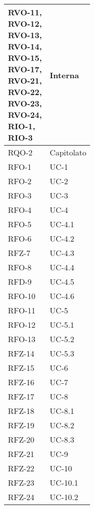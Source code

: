 \begin{xltabular}{\textwidth}{|X | X|}
{                RVO-11, \\
                RVO-12, \\
                RVO-13, \\
                RVO-14, \\
                RVO-15, \\
                RVO-17, \\
                RVO-21, \\
                RVO-22, \\
                RVO-23, \\
                RVO-24, \\
                RIO-1, \\
                RIO-3} & Interna \\
    \hline
    RQO-2 & Capitolato \\
    \hline
    RFO-1 & UC-1  \\
    \hline
    RFO-2 & UC-2  \\
    \hline
    RFO-3 & UC-3 \\
    \hline
    RFO-4 & UC-4 \\
    \hline
    RFO-5 & UC-4.1 \\
    \hline
    RFO-6 & UC-4.2 \\
    \hline
    RFZ-7 & UC-4.3 \\
    \hline
    RFO-8 & UC-4.4 \\ 
    \hline
    RFD-9 & UC-4.5 \\
    \hline
    RFO-10 & UC-4.6\\
    \hline
    RFO-11 & UC-5 \\
    \hline
    RFO-12 & UC-5.1 \\
    \hline
    RFO-13 & UC-5.2 \\
    \hline
    RFZ-14 & UC-5.3 \\
    \hline
    RFZ-15 & UC-6 \\
    \hline
    RFZ-16 & UC-7 \\
    \hline
    RFZ-17 & UC-8 \\
    \hline
    RFZ-18 & UC-8.1 \\
    \hline
    RFZ-19 & UC-8.2 \\
    \hline
    RFZ-20 & UC-8.3 \\
    \hline
    RFZ-21 & UC-9 \\
    \hline
    RFZ-22 & UC-10 \\
    \hline
    RFZ-23 & UC-10.1 \\
    \hline
    RFZ-24 & UC-10.2 \\

\end{xltabular}
